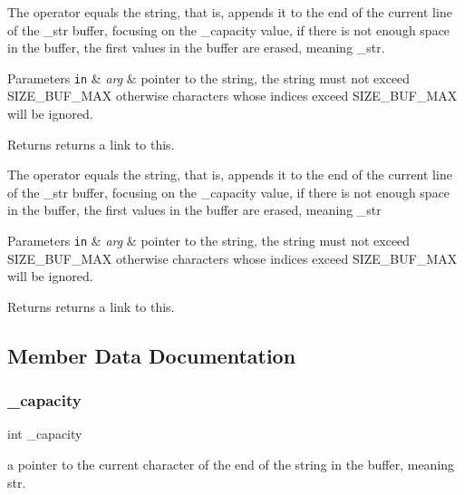 The operator equals the string, that is, appends it to the end of the current line of the \+\_\+str buffer, focusing on the \+\_\+capacity value, if there is not enough space in the buffer, the first values in the buffer are erased, meaning \+\_\+str. 


\begin{DoxyParams}[1]{Parameters}
\mbox{\tt in}  & {\em arg} & pointer to the string, the string must not exceed S\+I\+Z\+E\+\_\+\+B\+U\+F\+\_\+\+M\+AX otherwise characters whose indices exceed S\+I\+Z\+E\+\_\+\+B\+U\+F\+\_\+\+M\+AX will be ignored. \\
\hline
\end{DoxyParams}
\begin{DoxyReturn}{Returns}
returns a link to this.
\end{DoxyReturn}
The operator equals the string, that is, appends it to the end of the current line of the \+\_\+str buffer, focusing on the \+\_\+capacity value, if there is not enough space in the buffer, the first values in the buffer are erased, meaning \+\_\+str 
\begin{DoxyParams}[1]{Parameters}
\mbox{\tt in}  & {\em arg} & pointer to the string, the string must not exceed S\+I\+Z\+E\+\_\+\+B\+U\+F\+\_\+\+M\+AX otherwise characters whose indices exceed S\+I\+Z\+E\+\_\+\+B\+U\+F\+\_\+\+M\+AX will be ignored. \\
\hline
\end{DoxyParams}
\begin{DoxyReturn}{Returns}
returns a link to this. 
\end{DoxyReturn}


\subsection{Member Data Documentation}
\mbox{\label{classmessage_adc9ca8d1d3cf06b3975b6e768a942c61}} 
\subsubsection{\texorpdfstring{\+\_\+capacity}{\_capacity}}
{\footnotesize\ttfamily int \+\_\+capacity\hspace{0.3cm}{\ttfamily [private]}}



a pointer to the current character of the end of the string in the buffer, meaning str. 

